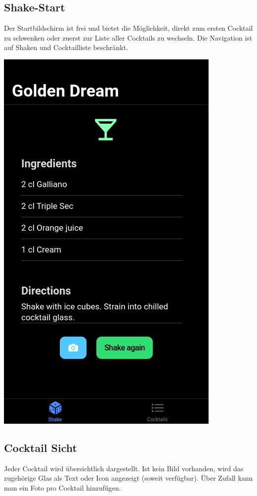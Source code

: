\documentclass[a4paper, 10pt]{article}
\begin{document}
\begin{multicols}{4}
    \subsection{Shake-Start}
    Der Startbildschirm ist frei und bietet die Möglichkeit, direkt zum ersten Cocktail zu schwenken oder zuerst zur Liste aller Cocktails zu wechseln. Die Navigation ist auf Shaken und Cocktailliste beschränkt.
    \columnbreak

    \begin{center}
        \includegraphics[width=.8\linewidth]{ShakeCocktail.png}
    \end{center}
    \columnbreak
    \subsection{Cocktail Sicht}
    Jeder Cocktail wird übersichtlich dargestellt. Ist kein Bild vorhanden, wird das zugehörige Glas als Text oder Icon angezeigt (soweit verfügbar). Über Zufall kann man ein Foto pro Cocktail hinzufügen.
\end{multicols}
\end{document}
